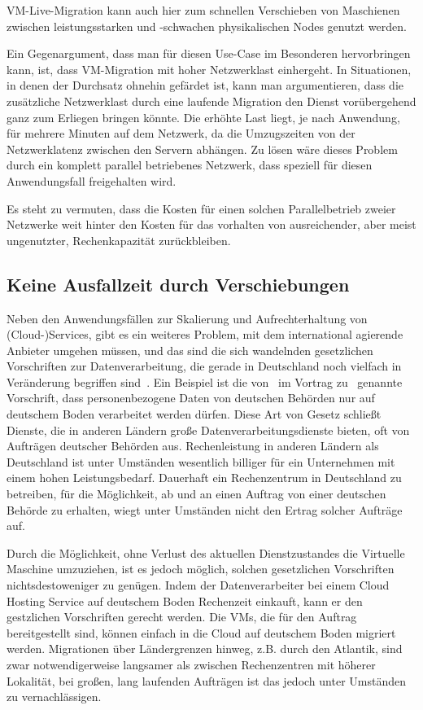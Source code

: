 VM-Live-Migration kann auch hier zum schnellen Verschieben von
Maschienen zwischen leistungsstarken und -schwachen physikalischen
Nodes genutzt werden.

Ein Gegenargument, dass man für diesen Use-Case im Besonderen
hervorbringen kann, ist, dass VM-Migration mit hoher Netzwerklast
einhergeht. In Situationen, in denen der Durchsatz ohnehin gefärdet
ist, kann man argumentieren, dass die zusätzliche Netzwerklast durch
eine laufende Migration den Dienst vorübergehend ganz zum Erliegen
bringen könnte. Die erhöhte Last liegt, je nach Anwendung, für mehrere
Minuten auf dem Netzwerk, da die Umzugszeiten von der Netzwerklatenz
zwischen den Servern abhängen. Zu lösen wäre dieses Problem durch ein
komplett parallel betriebenes Netzwerk, dass speziell für diesen
Anwendungsfall freigehalten wird.

Es steht zu vermuten, dass die Kosten für einen solchen
Parallelbetrieb zweier Netzwerke weit hinter den Kosten für das
vorhalten von ausreichender, aber meist ungenutzter, Rechenkapazität
zurückbleiben.

\subsection{Keine Ausfallzeit durch Verschiebungen}
\label{sec:keine-ausfallzeit}
Neben den Anwendungsfällen zur Skalierung und Aufrechterhaltung von
(Cloud-)Services, gibt es ein weiteres Problem, mit dem international
agierende Anbieter umgehen müssen, und das sind die sich wandelnden
gesetzlichen Vorschriften zur Datenverarbeitung, die gerade in
Deutschland noch vielfach in Veränderung begriffen
sind~\cite{bdsg-2009}. Ein Beispiel ist die von~\cite{MrBlah} im
Vortrag zu~\cite{foo} genannte Vorschrift, dass personenbezogene Daten
von deutschen Behörden nur auf deutschem Boden verarbeitet werden
dürfen. Diese Art von Gesetz schließt Dienste, die in anderen Ländern
große Datenverarbeitungsdienste bieten, oft von Aufträgen deutscher
Behörden aus. Rechenleistung in anderen Ländern als Deutschland ist
unter Umständen wesentlich billiger für ein Unternehmen mit einem
hohen Leistungsbedarf. Dauerhaft ein Rechenzentrum in Deutschland zu
betreiben, für die Möglichkeit, ab und an einen Auftrag von einer
deutschen Behörde zu erhalten, wiegt unter Umständen nicht den Ertrag
solcher Aufträge auf.

Durch die Möglichkeit, ohne Verlust des aktuellen Dienstzustandes die
Virtuelle Maschine umzuziehen, ist es jedoch möglich, solchen
gesetzlichen Vorschriften nichtsdestoweniger zu genügen. Indem der
Datenverarbeiter bei einem Cloud Hosting Service auf deutschem Boden
Rechenzeit einkauft, kann er den gestzlichen Vorschriften gerecht
werden. Die VMs, die für den Auftrag bereitgestellt sind, können
einfach in die Cloud auf deutschem Boden migriert werden. Migrationen
über Ländergrenzen hinweg, z.B. durch den Atlantik, sind zwar
notwendigerweise langsamer als zwischen Rechenzentren mit höherer
Lokalität, bei großen, lang laufenden Aufträgen ist das jedoch unter
Umständen zu vernachlässigen.

